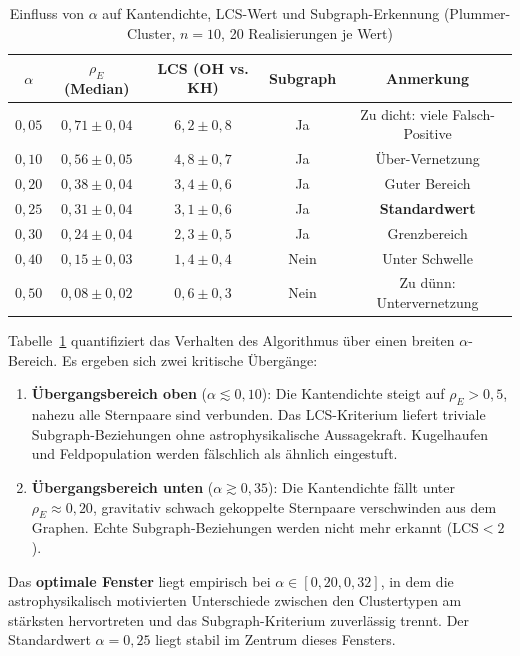 ﻿\documentclass[a4paper,12pt]{report}
\theoremstyle{definition}
\begin{document}
\begin{table}[H]
\centering
\caption{Einfluss von $\alpha$ auf Kantendichte, LCS-Wert und Subgraph-Erkennung (Plummer-Cluster, $n = 10$, 20 Realisierungen je Wert)}
\label{tab:alpha}
\begin{tabular}{ccccc}
\toprule
$\alpha$ & $\rho_E$ (Median) & LCS (OH vs. KH) & Subgraph & Anmerkung \\
\midrule
$0{,}05$ & $0{,}71 \pm 0{,}04$ & $6{,}2 \pm 0{,}8$ & Ja  & Zu dicht: viele Falsch-Positive \\
$0{,}10$ & $0{,}56 \pm 0{,}05$ & $4{,}8 \pm 0{,}7$ & Ja  & Über-Vernetzung \\
$0{,}20$ & $0{,}38 \pm 0{,}04$ & $3{,}4 \pm 0{,}6$ & Ja  & Guter Bereich \\
$0{,}25$ & $0{,}31 \pm 0{,}04$ & $3{,}1 \pm 0{,}6$ & Ja  & \textbf{Standardwert} \\
$0{,}30$ & $0{,}24 \pm 0{,}04$ & $2{,}3 \pm 0{,}5$ & Ja  & Grenzbereich \\
$0{,}40$ & $0{,}15 \pm 0{,}03$ & $1{,}4 \pm 0{,}4$ & Nein & Unter Schwelle \\
$0{,}50$ & $0{,}08 \pm 0{,}02$ & $0{,}6 \pm 0{,}3$ & Nein & Zu dünn: Untervernetzung \\
\bottomrule
\end{tabular}
\end{table}

Tabelle~\ref{tab:alpha} quantifiziert das Verhalten des Algorithmus über einen breiten $\alpha$-Bereich. Es ergeben sich zwei kritische Übergänge:

\begin{enumerate}
    \item \textbf{Übergangsbereich oben} ($\alpha \lesssim 0{,}10$): Die Kantendichte steigt auf $\rho_E > 0{,}5$, nahezu alle Sternpaare sind verbunden. Das LCS-Kriterium liefert triviale Subgraph-Beziehungen ohne astrophysikalische Aussagekraft. Kugelhaufen und Feldpopulation werden fälschlich als ähnlich eingestuft.

    \item \textbf{Übergangsbereich unten} ($\alpha \gtrsim 0{,}35$): Die Kantendichte fällt unter $\rho_E \approx 0{,}20$, gravitativ schwach gekoppelte Sternpaare verschwinden aus dem Graphen. Echte Subgraph-Beziehungen werden nicht mehr erkannt ($\mathrm{LCS} < 2$).
\end{enumerate}

Das \textbf{optimale Fenster} liegt empirisch bei $\alpha \in [0{,}20, 0{,}32]$, in dem die astrophysikalisch motivierten Unterschiede zwischen den Clustertypen am stärksten hervortreten und das Subgraph-Kriterium zuverlässig trennt. Der Standardwert $\alpha = 0{,}25$ liegt stabil im Zentrum dieses Fensters.
\end{document}
